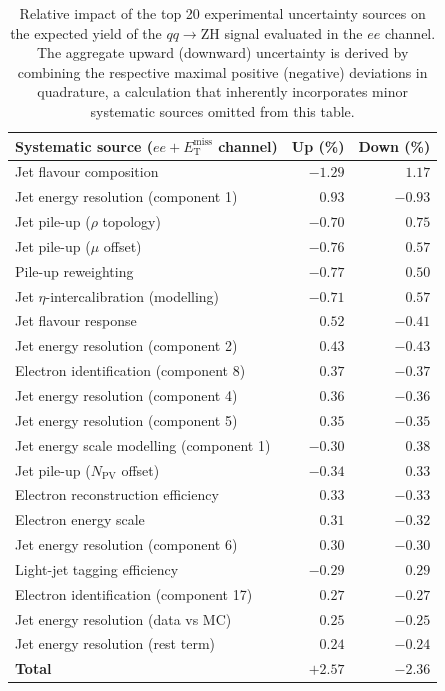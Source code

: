 \begin{table}[!htbp]
\centering
\begin{tabular}{lrr}
\toprule
\textbf{Systematic source} ($ee + E_{\text{T}}^{\text{miss}}$ channel) & \textbf{Up (\%)} & \textbf{Down (\%)} \\
\midrule
Jet flavour composition                         & $-1.29$ &  $1.17$ \\
Jet energy resolution (component 1)             &  $0.93$ & $-0.93$ \\
Jet pile-up ($\rho$ topology)                   & $-0.70$ &  $0.75$ \\
Jet pile-up ($\mu$ offset)                      & $-0.76$ &  $0.57$ \\
Pile-up reweighting                             & $-0.77$ &  $0.50$ \\
Jet $\eta$-intercalibration (modelling)         & $-0.71$ &  $0.57$ \\
Jet flavour response                            &  $0.52$ & $-0.41$ \\
Jet energy resolution (component 2)             &  $0.43$ & $-0.43$ \\
Electron identification (component 8)           &  $0.37$ & $-0.37$ \\
Jet energy resolution (component 4)             &  $0.36$ & $-0.36$ \\
Jet energy resolution (component 5)             &  $0.35$ & $-0.35$ \\
Jet energy scale modelling (component 1)        & $-0.30$ &  $0.38$ \\
Jet pile-up ($N_{\text{PV}}$ offset)            & $-0.34$ &  $0.33$ \\
Electron reconstruction efficiency              &  $0.33$ & $-0.33$ \\
Electron energy scale                           &  $0.31$ & $-0.32$ \\
Jet energy resolution (component 6)             &  $0.30$ & $-0.30$ \\
Light-jet tagging efficiency                    & $-0.29$ &  $0.29$ \\
Electron identification (component 17)          &  $0.27$ & $-0.27$ \\
Jet energy resolution (data vs MC)              &  $0.25$ & $-0.25$ \\
Jet energy resolution (rest term)               &  $0.24$ & $-0.24$ \\
\midrule
\textbf{Total} &$+2.57$ & $-2.36$ \\
\bottomrule
\end{tabular}
\caption{\rm Relative impact of the top 20 experimental uncertainty sources on the expected yield of the $qq \to \text{ZH}$ signal evaluated in the $ee$ channel. The aggregate upward (downward) uncertainty is derived by combining the respective maximal positive (negative) deviations in quadrature, a calculation that inherently incorporates minor systematic sources omitted from this table.}
\label{tab:syst-uncertainties-ee}
\end{table}


